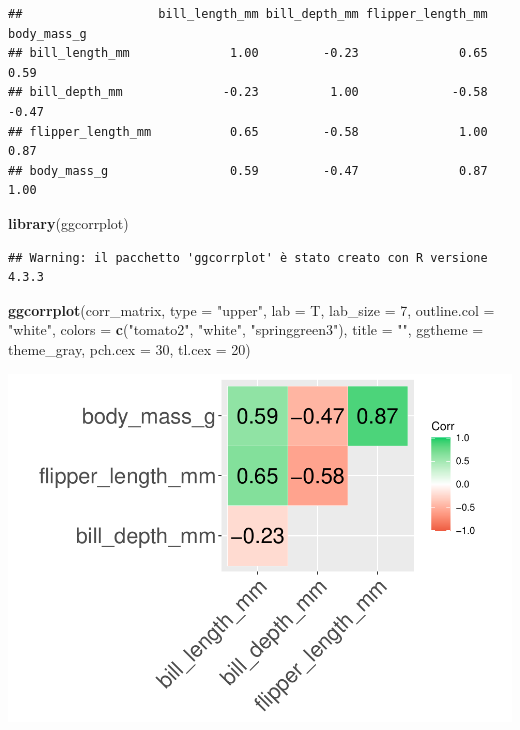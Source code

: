 \documentclass[
]{article}
\newenvironment{Shaded}{\begin{snugshade}}{\end{snugshade}}
\newcommand{\AttributeTok}[1]{\textcolor[rgb]{0.13,0.29,0.53}{#1}}
\newcommand{\DecValTok}[1]{\textcolor[rgb]{0.00,0.00,0.81}{#1}}
\newcommand{\FunctionTok}[1]{\textcolor[rgb]{0.13,0.29,0.53}{\textbf{#1}}}
\newcommand{\NormalTok}[1]{#1}
\newcommand{\StringTok}[1]{\textcolor[rgb]{0.31,0.60,0.02}{#1}}
\begin{document}
\begin{verbatim}
##                   bill_length_mm bill_depth_mm flipper_length_mm body_mass_g
## bill_length_mm              1.00         -0.23              0.65        0.59
## bill_depth_mm              -0.23          1.00             -0.58       -0.47
## flipper_length_mm           0.65         -0.58              1.00        0.87
## body_mass_g                 0.59         -0.47              0.87        1.00
\end{verbatim}

\begin{Shaded}
\begin{Highlighting}[]
\FunctionTok{library}\NormalTok{(ggcorrplot)                                             }
\end{Highlighting}
\end{Shaded}

\begin{verbatim}
## Warning: il pacchetto 'ggcorrplot' è stato creato con R versione 4.3.3
\end{verbatim}

\begin{Shaded}
\begin{Highlighting}[]
\FunctionTok{ggcorrplot}\NormalTok{(corr\_matrix, }
           \AttributeTok{type =} \StringTok{"upper"}\NormalTok{, }
           \AttributeTok{lab =}\NormalTok{ T, }
           \AttributeTok{lab\_size =} \DecValTok{7}\NormalTok{, }
           \AttributeTok{outline.col =} \StringTok{"white"}\NormalTok{, }
           \AttributeTok{colors =} \FunctionTok{c}\NormalTok{(}\StringTok{"tomato2"}\NormalTok{, }\StringTok{"white"}\NormalTok{, }\StringTok{"springgreen3"}\NormalTok{), }
           \AttributeTok{title =} \StringTok{""}\NormalTok{, }
           \AttributeTok{ggtheme =}\NormalTok{ theme\_gray, }
           \AttributeTok{pch.cex =} \DecValTok{30}\NormalTok{, }
           \AttributeTok{tl.cex =} \DecValTok{20}\NormalTok{)}
\end{Highlighting}
\end{Shaded}

\includegraphics{EDA_files/figure-latex/unnamed-chunk-36-1.pdf}
\end{document}

